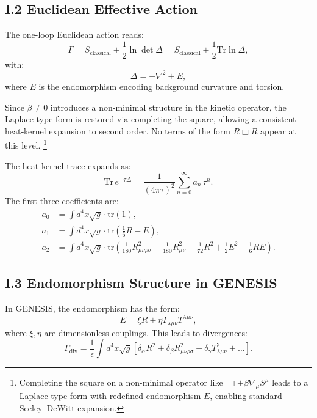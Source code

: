 \documentclass{article}
\begin{document}
\subsection*{I.2 Euclidean Effective Action }
The one-loop Euclidean action reads:
\begin{equation}\label{eq:auto203}
\Gamma = S_{\text{classical}} + \frac{1}{2} \ln \det \Delta = S_{\text{classical}} + \frac{1}{2} \text{Tr} \ln \Delta,
\end{equation}
with:
\begin{equation}\label{eq:auto204}
\Delta = -\nabla^2 + E,
\end{equation}
where \(E\) is the endomorphism encoding background curvature and torsion.

\noindent
Since $\beta \neq 0$ introduces a non‑minimal structure in the kinetic operator, the Laplace‑type form is restored via completing the square, allowing a consistent heat‑kernel expansion to second order. No terms of the form $R \Box R$ appear at this level.
\footnote{Completing the square on a non-minimal operator like $\Box + \beta \nabla_\mu S^\mu$ leads to a Laplace-type form with redefined endomorphism $E$, enabling standard Seeley–DeWitt expansion.}


The heat kernel trace expands as:
\begin{equation}\label{eq:auto205}
\text{Tr} \, e^{-\tau \Delta} = \frac{1}{(4\pi \tau)^2} \sum_{n=0}^\infty a_n \, \tau^n.
\end{equation}
The first three coefficients are:
\begin{equation}\label{eq:auto206}
\begin{aligned}
a_0 &= \int d^4x \sqrt{g} \cdot \text{tr}(1), \\
a_1 &= \int d^4x \sqrt{g} \cdot \text{tr}\left( \frac{1}{6} R - E \right), \\
a_2 &= \int d^4x \sqrt{g} \cdot \text{tr}\left( \frac{1}{180} R_{\mu\nu\rho\sigma}^2 - \frac{1}{180} R_{\mu\nu}^2 + \frac{1}{72} R^2 + \frac{1}{2} E^2 - \frac{1}{6} R E \right).
\end{aligned}
\end{equation}

\subsection*{I.3 Endomorphism Structure in GENESIS}
In GENESIS, the endomorphism has the form:
\begin{equation}\label{eq:auto207}
E = \xi R + \eta T_{\lambda\mu\nu}T^{\lambda\mu\nu},
\end{equation}
where \(\xi,\eta\) are dimensionless couplings. This leads to divergences:
\begin{equation}\label{eq:auto208}
\Gamma_{\text{div}} = \frac{1}{\epsilon} \int d^4x \sqrt{g} \left[ \delta_\alpha R^2 + \delta_\beta R_{\mu\nu\rho\sigma}^2 + \delta_\gamma T_{\lambda\mu\nu}^2 + \ldots \right].
\end{equation}
\end{document}
